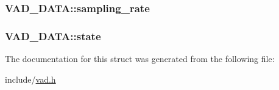 \subsubsection[{\texorpdfstring{sampling\+\_\+rate}{sampling_rate}}]{ V\+A\+D\+\_\+\+D\+A\+T\+A\+::sampling\+\_\+rate}\hypertarget{structVAD__DATA_ad2b4da91b7353a41a0fe64e65093e056}{}\label{structVAD__DATA_ad2b4da91b7353a41a0fe64e65093e056}
\subsubsection[{\texorpdfstring{state}{state}}]{ V\+A\+D\+\_\+\+D\+A\+T\+A\+::state}\hypertarget{structVAD__DATA_a02d71db9de6c2438820ea1cfab9187bf}{}\label{structVAD__DATA_a02d71db9de6c2438820ea1cfab9187bf}


The documentation for this struct was generated from the following file\+:\begin{DoxyCompactItemize}
\item 
include/\hyperlink{vad_8h}{vad.\+h}\end{DoxyCompactItemize}

